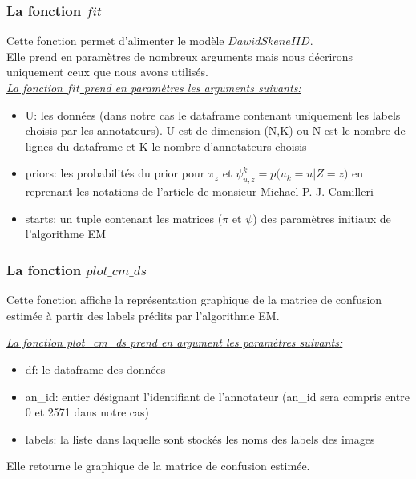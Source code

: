 \documentclass[a4paper,french,10pt]{article}
\begin{document}
	\subsubsection{La fonction $fit$}
	Cette fonction permet d'alimenter le modèle $DawidSkeneIID$. \\
	Elle prend en paramètres de nombreux arguments mais nous décrirons uniquement ceux que nous avons utilisés. \\
	\textit{\underline{La fonction $fit$ prend en paramètres les arguments suivants:}}
	\vspace{2mm}
	\begin{itemize}
		\item U: les données (dans notre cas le dataframe contenant uniquement les labels choisis par les annotateurs). U est de dimension (N,K) ou N est le nombre de lignes du dataframe et K le nombre d'annotateurs choisis \\
		\item priors: les probabilités du prior pour $\pi_z$ et $\psi_{u,z}^k = p\big(u_k = u | Z = z\big)$ en reprenant les notations de l'article de monsieur Michael P. J. Camilleri \\
		\item starts: un tuple contenant les matrices ($\pi$ et $\psi$) des paramètres initiaux de l'algorithme EM
	\end{itemize}

	\subsubsection{La fonction $plot\_cm\_ds$}
	Cette fonction affiche la représentation graphique de la matrice de confusion estimée à partir des labels prédits par l'algorithme EM.
	
	
	
	\underline{\textit{La fonction plot\_cm\_ds prend en argument les paramètres suivants:}}
	\vspace{2mm}
	\begin{itemize}
		\item df: le dataframe des données \\
		\item an\_id: entier désignant l'identifiant de l'annotateur (an\_id sera compris entre 0 et 2571 dans notre cas) \\
		\item labels: la liste dans laquelle sont stockés les noms des labels des images
	\end{itemize}
	\vspace{2mm}
	Elle retourne le graphique de la matrice de confusion estimée.
	
\end{document}
